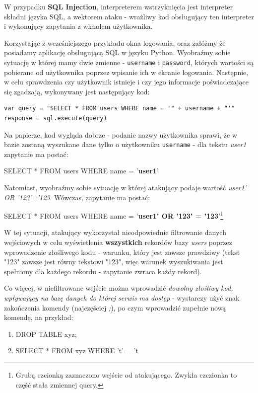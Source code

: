 \documentclass[12pt,a4paper]{article}
\begin{document}
W przypadku \textbf{SQL Injection}, interpreterem wstrzyknięcia jest interpreter składni języka SQL, a wektorem ataku - wrażliwy
kod obsługujący ten interpreter i wykonujący zapytania z wkładem użytkownika.

Korzystając z wcześniejszego przykładu okna logowania, oraz załóżmy że posiadamy aplikację obsługującą SQL w języku Python.
Wyobraźmy sobie sytuację w której mamy dwie zmienne - \verb|username| i \verb|password|, których wartości są pobierane od 
użytkownika poprzez wpisanie ich w ekranie logowania. Następnie, w celu sprawdzenia czy użytkownik istnieje i czy jego 
informacje poświadczające się zgadzają, wykonywany jest następujący kod:
\begin{tcolorbox}
\begin{verbatim}
var query = "SELECT * FROM users WHERE name = '" + username + "'"
response = sql.execute(query)
\end{verbatim} 
\end{tcolorbox}

Na papierze, kod wygląda dobrze - podanie nazwy użytkownika sprawi, że w bazie zostaną wyszukane dane tylko o użytkowniku \verb|username|
- dla tekstu \textit{user1} zapytanie ma postać:
\begin{tcolorbox}
SELECT * FROM users WHERE name = '\textbf{user1}'
\end{tcolorbox}
 
Natomiast, wyobraźmy sobie sytuację w której atakujący podaje wartość \emph{user1' OR '123'='123}. Wówczas, zapytanie ma postać:
\begin{tcolorbox}
SELECT * FROM users WHERE name = '\textbf{user1' OR '123' = '123}'\footnote{Grubą czcionką zaznaczono wejście od atakującego. Zwykła czczionka
to część stała zmiennej query.}
\end{tcolorbox}

W tej sytuacji, atakujący wykorzystał nieodpowiednie filtrowanie danych wejściowych w celu wyświetlenia \textbf{wszystkich} rekordów bazy
\emph{users} poprzez wprowadzenie złośliwego kodu - warunku, który jest zawsze prawdziwy (tekst "123" zawsze jest równy tekstowi "123", 
więc warunek wyszukiwania jest spełniony dla każdego rekordu - zapytanie zwraca każdy rekord).

Co więcej, w niefiltrowane wejście można wprowadzić \emph{dowolny złośliwy kod, wpływający na bazę danych do której serwis ma dostęp} - 
wystarczy użyć znak zakończenia komendy (najczęściej \emph{;}), po czym wprowadzić zupełnie nową komendę, na przykład:
\begin{enumerate}
    \item DROP TABLE xyz;
    \item SELECT * FROM xyz WHERE 't' = 't 
\end{enumerate} 
\end{document}

